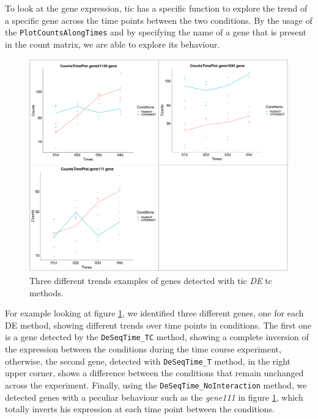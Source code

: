 To look at the gene expression, \gls{tic} has a specific function to explore the trend of a specific gene across the time points between the two conditions. 
By the usage of the \lstinline!PlotCountsAlongTimes! and by specifying the name of a gene that is present in the count matrix, we are able to explore its behaviour.

\begin{figure}[H]
\includegraphics[width=\textwidth,keepaspectratio]{img/ticorser/de/trends/trends.pdf}
\caption[ticorser genes trends]{Three different trends examples of genes detected with \gls{tic} \textit{DE} \gls{tc} methods.}
\label{fig:ticorsertrends}
\centering
\end{figure}

For example looking at figure \ref{fig:ticorsertrends}, we identified three different genes, one for each DE method, showing different trends over time points in conditions.
The first one is a gene detected by the \lstinline!DeSeqTime_TC! method, showing a complete inversion of the expression between the conditions during the time course experiment, otherwise, the second gene, detected with \lstinline!DeSeqTime_T! method, in the right upper corner, shows a difference between the conditions that remain unchanged across the experiment.
Finally, using the \lstinline!DeSeqTime_NoInteraction! method, we detected genes with a peculiar behaviour such as the \textit{gene111} in figure \ref{fig:ticorsertrends}, which totally inverts his expression at each time point between the conditions. 

